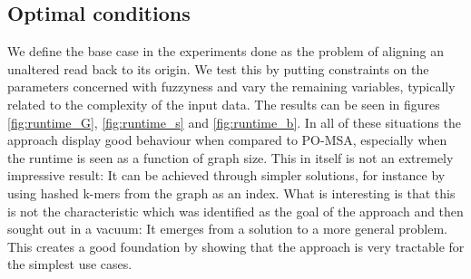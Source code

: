 \documentclass[thesis.tex]{subfiles}
\begin{document}
\subsection*{Optimal conditions}
We define the base case in the experiments done as the problem of aligning an unaltered read back to its origin. We test this by putting constraints on the parameters concerned with fuzzyness and vary the remaining variables, typically related to the complexity of the input data. The results can be seen in figures \ref{fig:runtime_G}, \ref{fig:runtime_s} and \ref{fig:runtime_b}. In all of these situations the approach display good behaviour when compared to PO-MSA, especially when the runtime is seen as a function of graph size. This in itself is not an extremely impressive result: It can be achieved through simpler solutions, for instance by using hashed k-mers from the graph as an index. What is interesting is that this is not the characteristic which was identified as the goal of the approach and then sought out in a vacuum: It emerges from a solution to a more general problem. This creates a good foundation by showing that the approach is very tractable for the simplest use cases.
\end{document}
